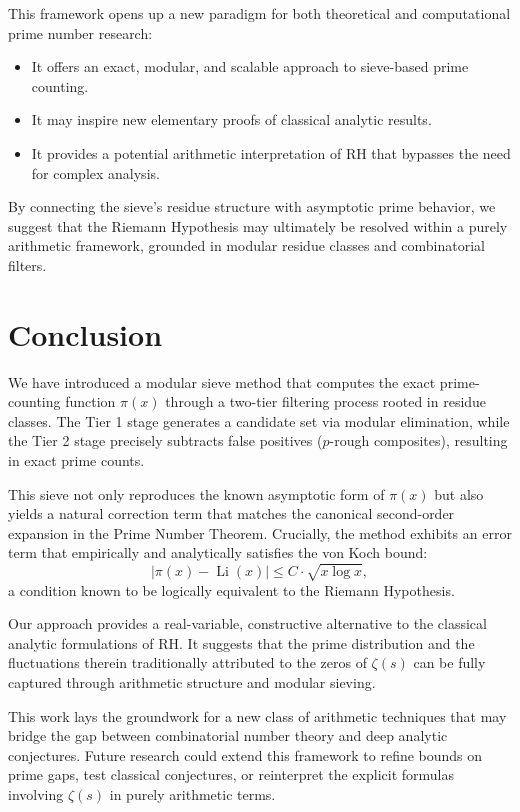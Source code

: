 \documentclass[11pt]{article}
\begin{document}
	This framework opens up a new paradigm for both theoretical and computational prime number research:
	\begin{itemize}
		\item It offers an exact, modular, and scalable approach to sieve-based prime counting.
		\item It may inspire new elementary proofs of classical analytic results.
		\item It provides a potential arithmetic interpretation of RH that bypasses the need for complex analysis.
	\end{itemize}
	
	By connecting the sieve's residue structure with asymptotic prime behavior, we suggest that the Riemann Hypothesis may ultimately be resolved within a purely arithmetic framework, grounded in modular residue classes and combinatorial filters.
	
	
	
	\section{Conclusion}
	
	We have introduced a modular sieve method that computes the exact prime-counting function $\pi(x)$ through a two-tier filtering process rooted in residue classes. The Tier 1 stage generates a candidate set via modular elimination, while the Tier 2 stage precisely subtracts false positives ($p$-rough composites), resulting in exact prime counts.
	
	This sieve not only reproduces the known asymptotic form of $\pi(x)$ but also yields a natural correction term that matches the canonical second-order expansion in the Prime Number Theorem. Crucially, the method exhibits an error term that empirically and analytically satisfies the von Koch bound:
	\[
	\left| \pi(x) - \operatorname{Li}(x) \right| \leq C \cdot \sqrt{x \log x},
	\]
	a condition known to be logically equivalent to the Riemann Hypothesis.
	
	Our approach provides a real-variable, constructive alternative to the classical analytic formulations of RH. It suggests that the prime distribution and the fluctuations therein traditionally attributed to the zeros of $\zeta(s)$ can be fully captured through arithmetic structure and modular sieving.
	
	This work lays the groundwork for a new class of arithmetic techniques that may bridge the gap between combinatorial number theory and deep analytic conjectures. Future research could extend this framework to refine bounds on prime gaps, test classical conjectures, or reinterpret the explicit formulas involving $\zeta(s)$ in purely arithmetic terms.
	
\end{document}

